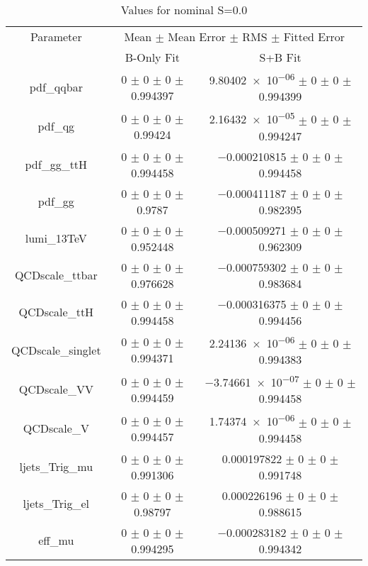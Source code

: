 \begin{table}
\centering
\caption{Values for nominal S=0.0}
\begin{tabular}{ccc}
\toprule
Parameter 	& \multicolumn{2}{c}{Mean $\pm$ Mean Error $\pm$ RMS $\pm$ Fitted Error}\\
 	& B-Only Fit & S+B Fit\\
\midrule
pdf\_qqbar 	& \num{0} $\pm$ \num{0} $\pm$ \num{0} $\pm$ \num{0.994397} 	& \num{9.80402e-06} $\pm$ \num{0} $\pm$ \num{0} $\pm$ \num{0.994399}\\
pdf\_qg 	& \num{0} $\pm$ \num{0} $\pm$ \num{0} $\pm$ \num{0.99424} 	& \num{2.16432e-05} $\pm$ \num{0} $\pm$ \num{0} $\pm$ \num{0.994247}\\
pdf\_gg\_ttH 	& \num{0} $\pm$ \num{0} $\pm$ \num{0} $\pm$ \num{0.994458} 	& \num{-0.000210815} $\pm$ \num{0} $\pm$ \num{0} $\pm$ \num{0.994458}\\
pdf\_gg 	& \num{0} $\pm$ \num{0} $\pm$ \num{0} $\pm$ \num{0.9787} 	& \num{-0.000411187} $\pm$ \num{0} $\pm$ \num{0} $\pm$ \num{0.982395}\\
lumi\_13TeV 	& \num{0} $\pm$ \num{0} $\pm$ \num{0} $\pm$ \num{0.952448} 	& \num{-0.000509271} $\pm$ \num{0} $\pm$ \num{0} $\pm$ \num{0.962309}\\
QCDscale\_ttbar 	& \num{0} $\pm$ \num{0} $\pm$ \num{0} $\pm$ \num{0.976628} 	& \num{-0.000759302} $\pm$ \num{0} $\pm$ \num{0} $\pm$ \num{0.983684}\\
QCDscale\_ttH 	& \num{0} $\pm$ \num{0} $\pm$ \num{0} $\pm$ \num{0.994458} 	& \num{-0.000316375} $\pm$ \num{0} $\pm$ \num{0} $\pm$ \num{0.994456}\\
QCDscale\_singlet 	& \num{0} $\pm$ \num{0} $\pm$ \num{0} $\pm$ \num{0.994371} 	& \num{2.24136e-06} $\pm$ \num{0} $\pm$ \num{0} $\pm$ \num{0.994383}\\
QCDscale\_VV 	& \num{0} $\pm$ \num{0} $\pm$ \num{0} $\pm$ \num{0.994459} 	& \num{-3.74661e-07} $\pm$ \num{0} $\pm$ \num{0} $\pm$ \num{0.994458}\\
QCDscale\_V 	& \num{0} $\pm$ \num{0} $\pm$ \num{0} $\pm$ \num{0.994457} 	& \num{1.74374e-06} $\pm$ \num{0} $\pm$ \num{0} $\pm$ \num{0.994458}\\
ljets\_Trig\_mu 	& \num{0} $\pm$ \num{0} $\pm$ \num{0} $\pm$ \num{0.991306} 	& \num{0.000197822} $\pm$ \num{0} $\pm$ \num{0} $\pm$ \num{0.991748}\\
ljets\_Trig\_el 	& \num{0} $\pm$ \num{0} $\pm$ \num{0} $\pm$ \num{0.98797} 	& \num{0.000226196} $\pm$ \num{0} $\pm$ \num{0} $\pm$ \num{0.988615}\\
eff\_mu 	& \num{0} $\pm$ \num{0} $\pm$ \num{0} $\pm$ \num{0.994295} 	& \num{-0.000283182} $\pm$ \num{0} $\pm$ \num{0} $\pm$ \num{0.994342}\\

\end{tabular}
\end{table}
